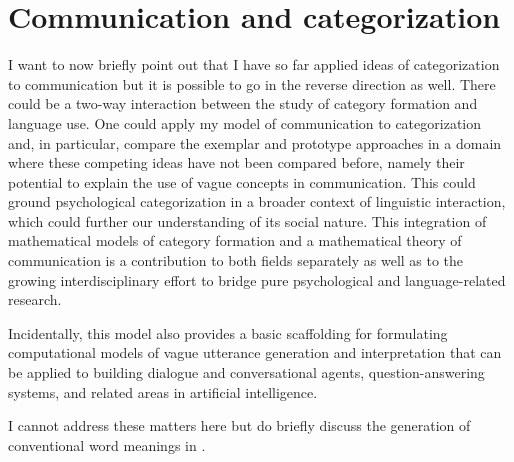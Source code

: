 \section{Communication and categorization}

I want to now briefly point out that I have so far applied ideas of categorization to communication but it is possible to go in the reverse direction as well. There could be a two-way interaction between the study of category formation and language use. One could apply my model of communication to categorization and, in particular, compare the exemplar and prototype approaches in a domain where these competing ideas have not been compared before, namely their potential to explain the use of vague concepts in communication. This could ground psychological categorization in a broader context of linguistic interaction, which could further our understanding of its social nature. This integration of mathematical models of category formation and a mathematical theory of communication is a contribution to both fields separately as well as to the growing interdisciplinary effort to bridge pure psychological and language-related research.  

Incidentally, this model also provides a basic scaffolding for formulating computational models of vague utterance generation and interpretation that can be applied to building dialogue and conversational agents, question-answering systems, and related areas in artificial intelligence.

I cannot address these matters here but do briefly discuss the generation of conventional word meanings in .


